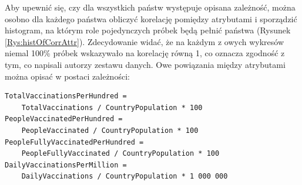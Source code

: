 \documentclass[12pt, oneside]{article}
\begin{document}
\begin{figure}[!ht]
\end{figure}




\newpage
Aby upewnić się, czy dla wszystkich państw występuje opisana zależność, można osobno dla każdego państwa obliczyć korelację pomiędzy atrybutami i sporządzić histogram, na którym role pojedynczych próbek będą pełnić państwa (Rysunek \ref{Rys:histOfCorrAttr}). Zdecydowanie widać, że na każdym z owych wykresów niemal 100\% próbek wskazywało na korelację równą 1, co oznacza zgodność z tym, co napisali autorzy zestawu danych. Owe powiązania między atrybutami można opisać w postaci zależności:

\begin{Verbatim}[tabsize=4]
TotalVaccinationsPerHundred = 
	TotalVaccinations / CountryPopulation * 100
PeopleVaccinatedPerHundred = 
	PeopleVaccinated / CountryPopulation * 100
PeopleFullyVaccinatedPerHundred = 
	PeopleFullyVaccinated / CountryPopulation * 100
DailyVaccinationsPerMillion = 
	DailyVaccinations / CountryPopulation * 1 000 000
\end{Verbatim}
\end{document}
